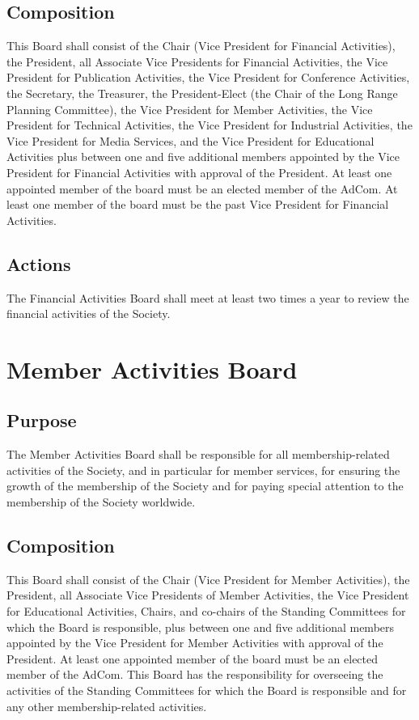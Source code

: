 \documentclass[10pt]{article}
\begin{document}
\subsection{Composition}
This Board shall consist of the Chair (Vice President for Financial Activities), the President,  all Associate Vice Presidents for Financial Activities, the Vice President for Publication Activities, the Vice President for Conference Activities, the Secretary, the Treasurer, the President-Elect (the Chair of the Long Range Planning Committee), the Vice President for Member Activities, the Vice President for Technical Activities, the Vice President for Industrial Activities, the Vice President for Media Services, and the Vice President for Educational Activities plus between one and five additional members appointed by the Vice President for Financial Activities with approval of the President. At least one appointed member of the board must be an elected member of the AdCom. At least one member of the board must be the past Vice President for Financial Activities.


\subsection{Actions}
The Financial Activities Board shall meet at least two times a year to review the financial activities of the Society. 


\section{Member Activities Board}
\label{MAB}
\subsection{Purpose}
The Member Activities Board shall be responsible for all membership-related activities of the Society, and in particular for member services, for ensuring the growth of the membership of the Society and for paying special attention to the membership of the Society worldwide.

\subsection{Composition}
This Board shall consist of the Chair (Vice President for Member Activities), the President, all Associate Vice Presidents of Member Activities, the Vice President for Educational Activities, Chairs, and co-chairs of the Standing Committees for which the Board is responsible, plus between one and five additional members appointed by the Vice President for Member Activities with approval of the President. At least one appointed member of the board must be an elected member of the AdCom. This Board has the responsibility for overseeing the activities of the Standing Committees for which the Board is responsible and for any other membership-related activities.
\end{document}
